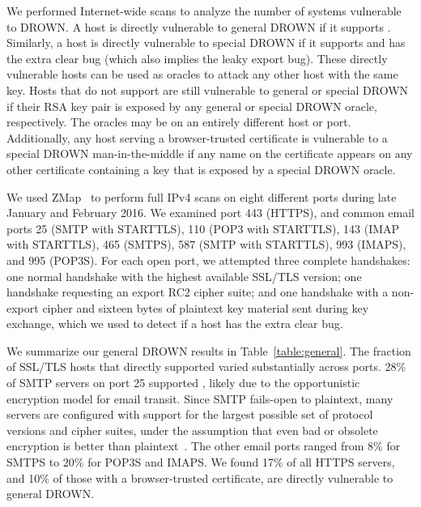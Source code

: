 \label{sec:scans}

We performed Internet-wide scans to analyze the number of systems vulnerable to
DROWN\@. A host is directly vulnerable to general DROWN if it supports \ssltwo.
Similarly, a host is directly vulnerable to special DROWN if it supports
\ssltwo and has the extra clear bug (which also implies the leaky export bug).
These directly vulnerable hosts can be
used as oracles to attack any other host with the same key. Hosts that do not
support \ssltwo are still vulnerable to general or special DROWN if their RSA
key pair is exposed by any general or special DROWN oracle, respectively. The
oracles may be on an entirely different host or port.  Additionally, any host
serving a browser-trusted certificate is vulnerable to a special DROWN
man-in-the-middle if any name on the certificate appears on any other
certificate containing a key that is exposed by a special DROWN oracle.

We used ZMap~\cite{zmap13} to perform full IPv4 scans on eight different ports
during late January and February 2016.  We examined port 443 (HTTPS), and
common email ports 25 (SMTP with STARTTLS), 110 (POP3 with STARTTLS), 143 (IMAP
with STARTTLS), 465 (SMTPS), 587 (SMTP with STARTTLS), 993 (IMAPS), and 995
(POP3S).  For each open port, we attempted three complete handshakes: one
normal handshake with the highest available SSL/TLS version; one \ssltwo
handshake requesting an export RC2 cipher suite; and one \ssltwo handshake with
a non-export cipher and sixteen bytes of plaintext key material sent during key
exchange, which we used to detect if a host has the extra clear bug.

We summarize our general DROWN results in Table~\ref{table:general}. The
fraction of SSL/TLS hosts that directly supported \ssltwo varied substantially
across ports. 28\% of SMTP servers on port 25 supported \ssltwo, likely due to
the opportunistic encryption model for email transit. Since SMTP fails-open to
plaintext, many servers are configured with support for the largest possible
set of protocol versions and cipher suites, under the assumption that even bad
or obsolete encryption is better than plaintext~\cite{better-crypto}. The other
email ports ranged from 8\% for SMTPS to 20\% for POP3S and IMAPS. We found
17\% of all HTTPS servers, and 10\% of those with a browser-trusted
certificate, are directly vulnerable to general DROWN\@.

\tabSpecialAll




